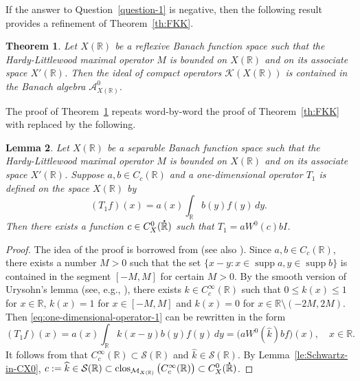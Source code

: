 \documentclass[reqno]{amsproc}
\newcommand{\cA}{\mathcal{A}}
\newcommand{\cK}{\mathcal{K}}
\newcommand{\cM}{\mathcal{M}}
\newcommand{\dR}{{\bf\dot{\R}}}
\newcommand{\R}{\mathbb{R}}
\newtheorem{theorem}{Theorem}[section]
\newtheorem{lemma}[theorem]{Lemma}
\theoremstyle{definition}
\theoremstyle{remark}
\numberwithin{equation}{section}
\begin{document}
If the answer to Question~\ref{question-1} is negative, then 
the following result provides a refinement of Theorem~\ref{th:FKK}.
\begin{theorem}\label{th:FKK-refined}
Let $X(\R)$ be a reflexive Banach function space such that the Hardy-Littlewood 
maximal operator $M$ is bounded on $X(\R)$ and on its associate 
space $X'(\R)$.  Then the ideal of compact operators $\cK(X(\R))$ is contained 
in the Banach algebra $\cA_{X(\R)}^0$.
\end{theorem}
The proof of Theorem~\ref{th:FKK-refined} repeats word-by-word the proof
of Theorem~\ref{th:FKK} with \cite[Lemma~4.2]{FKK19} replaced by the 
following.
\begin{lemma}\label{le:one-dimensional-operator}
Let $X(\R)$ be a separable Banach function space such that the Hardy-Littlewood 
maximal operator $M$ is bounded on $X(\R)$ and on its associate 
space $X'(\R)$. Suppose $a,b\in C_c(\R)$ and a
one-dimensional operator $T_1$ is defined on the space $X(\R)$ by
\begin{equation}\label{eq:one-dimensional-operator-1}
(T_1f)(x)=a(x)\int_\R b(y)f(y)\,dy.
\end{equation}
Then there exists a function $c\in C_{X}^0(\dR)$ 
such that $T_1=aW^0(c)bI$.
\end{lemma}
\begin{proof}
The idea of the proof is borrowed from \cite[Lemma~6.1]{KILH13a}
(see also \cite[Proposition~5.8.1]{RSS11}). Since $a,b\in C_c(\R)$, there
exists a number $M>0$ such that the set $\{x-y:x\in\operatorname{supp}a,
y\in\operatorname{supp}b\}$ is contained in the segment $[-M,M]$ for
certain $M>0$. By the smooth version of Urysohn's lemma (see, e.g.,
\cite[Proposition~6.5]{F09}), there exists $k\in C_c^\infty(\R)$
such that $0\le k(x)\le 1$ for $x\in\R$, $k(x)=1$ for $x\in[-M,M]$ and $k(x)=0$
for $x\in\R\setminus(-2M,2M)$. Then \eqref{eq:one-dimensional-operator-1}
can be rewritten in the form
\[
(T_1f)(x)=a(x)\int_\R k(x-y)b(y)f(y)\,dy=\big(aW^0(\widehat{k})bf\big)(x),
\quad
x\in\R.
\]
It follows from \cite[Example~2.2.2 and Proposition~2.2.11]{G14} that
$C_c^\infty(\R)\subset\mathcal{S}(\R)$ and $\widehat{k}\in\mathcal{S}(\R)$.
By Lemma~\ref{le:Schwartz-in-CX0}, 
$c:=\widehat{k}\in\mathcal{S}(\R)\subset
\operatorname{clos}_{\cM_{X(\R)}}\big(C_c^\infty(\R)\big)\subset C_X^0(\dR)$.
\end{proof}
\end{document}

